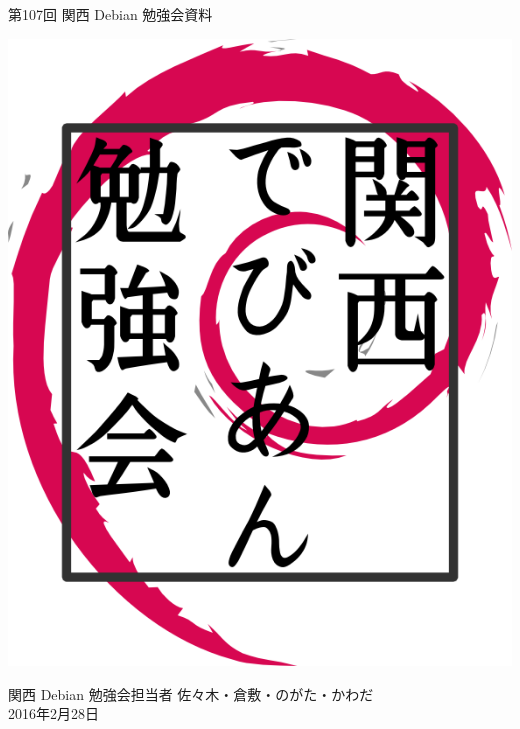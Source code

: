 \documentclass[mingoth,a4paper]{jsarticle}
\newcommand{\debmtgyear}{2016}
\newcommand{\debmtgdate}{28}
\newcommand{\debmtgmonth}{2}
\newcommand{\debmtgnumber}{107}
\begin{document}
\begin{titlepage}


 第\debmtgnumber{}回 関西 Debian 勉強会資料

\vspace{2cm}

\begin{center}
\includegraphics{image200802/kansaidebianlogo.png}
\end{center}

\begin{flushright}
\hfill{}関西 Debian 勉強会担当者 佐々木・倉敷・のがた・かわだ \\
\hfill{}\debmtgyear{}年\debmtgmonth{}月\debmtgdate{}日
\end{flushright}

\thispagestyle{empty}
\end{titlepage}


\vspace{1em}
\end{document}
